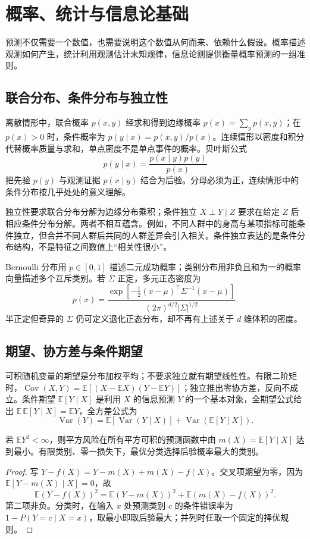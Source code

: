 \setcounter{chapter}{2} %
\chapter{概率、统计与信息论基础}
\label{chap:ml-probability}

预测不仅需要一个数值，也需要说明这个数值从何而来、依赖什么假设。概率描述观测如何产生，统计利用观测估计未知规律，信息论则提供衡量概率预测的一组准则。

\section{联合分布、条件分布与独立性}

离散情形中，联合概率 $p(x,y)$ 经求和得到边缘概率 $p(x)=\sum_yp(x,y)$；在 $p(x)>0$ 时，条件概率为 $p(y\mid x)=p(x,y)/p(x)$。连续情形以密度和积分代替概率质量与求和，单点密度不是单点事件的概率。贝叶斯公式
\[
 p(y\mid x)=\frac{p(x\mid y)p(y)}{p(x)}
\]
把先验 $p(y)$ 与观测证据 $p(x\mid y)$ 结合为后验。分母必须为正，连续情形中的条件分布按几乎处处的意义理解。

独立性要求联合分布分解为边缘分布乘积；条件独立 $X\perp Y\mid Z$ 要求在给定 $Z$ 后相应条件分布分解。两者不相互蕴含。例如，不同人群中的身高与某项指标可能条件独立，但合并不同人群后共同的人群差异会引入相关。条件独立表达的是条件分布结构，不是特征之间数值上“相关性很小”。

Bernoulli 分布用 $p\in[0,1]$ 描述二元成功概率；类别分布用非负且和为一的概率向量描述多个互斥类别。若 $\Sigma$ 正定，多元正态密度为
\[
 p(x)=\frac{\exp[-\tfrac12(x-\mu)^\top\Sigma^{-1}(x-\mu)]}
 {(2\pi)^{d/2}|\Sigma|^{1/2}}.
\]
半正定但奇异的 $\Sigma$ 仍可定义退化正态分布，却不再有上述关于 $d$ 维体积的密度。

\section{期望、协方差与条件期望}

可积随机变量的期望是分布加权平均；不要求独立就有期望线性性。有限二阶矩时，$\operatorname{Cov}(X,Y)=\mathbb E[(X-\mathbb EX)(Y-\mathbb EY)]$；独立推出零协方差，反向不成立。条件期望 $\mathbb E[Y\mid X]$ 是利用 $X$ 的信息预测 $Y$ 的一个基本对象，全期望公式给出 $\mathbb E\,\mathbb E[Y\mid X]=\mathbb EY$，全方差公式为
\[
 \operatorname{Var}(Y)=\mathbb E[\operatorname{Var}(Y\mid X)]
 +\operatorname{Var}(\mathbb E[Y\mid X]).
\]

\begin{proposition}[平方损失与零一损失的最优预测]
若 $\mathbb EY^2<\infty$，则平方风险在所有平方可积的预测函数中由 $m(X)=\mathbb E[Y\mid X]$ 达到最小。有限类别、零一损失下，最优分类选择后验概率最大的类别。
\end{proposition}
\begin{proof}
写 $Y-f(X)=Y-m(X)+m(X)-f(X)$。交叉项期望为零，因为 $\mathbb E[Y-m(X)\mid X]=0$，故
\[
 \mathbb E(Y-f(X))^2=\mathbb E(Y-m(X))^2+\mathbb E(m(X)-f(X))^2.
\]
第二项非负。分类时，在输入 $x$ 处预测类别 $c$ 的条件错误率为 $1-P(Y=c\mid X=x)$，取最小即取后验最大；并列时任取一个固定的择优规则。
\end{proof}

